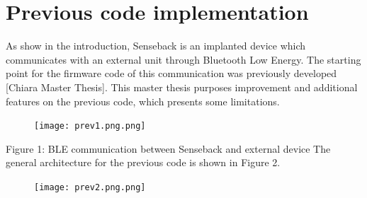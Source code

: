 \documentclass{Configuration_Files/PoliMi3i_thesis}
\begin{document}
\section{Previous code implementation}



As show in the introduction, Senseback is an implanted device which communicates with an external unit through Bluetooth Low Energy. The starting point for the firmware code of this communication was previously developed [Chiara Master Thesis]. This master thesis purposes improvement and additional features on the previous code, which presents some limitations.

\begin{figure}[H]
	\texttt{[image: prev1.png.png]}
	\centering
\end{figure}

Figure 1: BLE communication between Senseback and external device
The general architecture for the previous code is shown in Figure 2.

\begin{figure}[H]
	\texttt{[image: prev2.png.png]}
	\centering
\end{figure}
\end{document}
